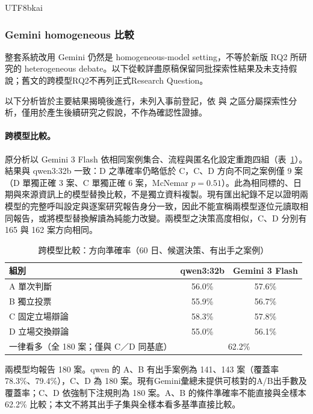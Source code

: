 \documentclass[12pt,a4paper]{article}
\newcommand{\grp}[1]{\textsf{#1}}
\begin{document}
\begin{CJK}{UTF8}{bkai}
\subsubsection{Gemini homogeneous 比較}

整套系統改用 Gemini 仍然是 homogeneous-model setting，不等於新版 RQ2 所研究的 heterogeneous debate。以下從較詳盡原稿保留同批探索性結果及未支持假說；舊文的跨模型RQ2不再列正式Research Question。


以下分析皆於主要結果揭曉後進行，未列入事前登記，依 \citet{wagenmakers2012agenda} 與 \citet{nosek2018prereg} 之區分屬探索性分析，僅用於產生後續研究之假說，不作為確認性證據。

\paragraph{跨模型比較。} 原分析以 Gemini 3 Flash 依相同案例集合、流程與匿名化設定重跑四組（表~\ref{tab:flash}）。結果與 qwen3:32b 一致：\grp{D} 之準確率仍略低於 \grp{C}，\grp{C}、\grp{D} 方向不同之案例僅 9 案（\grp{D} 單獨正確 3 案、\grp{C} 單獨正確 6 案，McNemar $p=0.51$）。此為相同標的、日期與來源資訊上的模型替換比較，不是獨立資料複製。現有匯出紀錄不足以證明兩模型的完整呼叫設定與逐案研究報告身分一致，因此不能宣稱兩模型逐位元讀取相同報告，或將模型替換解讀為純能力改變。兩模型之決策高度相似，\grp{C}、\grp{D} 分別有 165 與 162 案方向相同。

\begin{table}[H]
\centering\small
\caption{跨模型比較：方向準確率（60 日、候選決策、有出手之案例）}
\label{tab:flash}
\begin{tabular}{@{}lcc@{}}
\toprule
組別 & qwen3:32b & Gemini 3 Flash \\
\midrule
\grp{A} 單次判斷 & 56.0\% & 57.6\% \\
\grp{B} 獨立投票 & 55.9\% & 56.7\% \\
\grp{C} 固定立場辯論 & 58.3\% & 57.8\% \\
\grp{D} 立場交換辯論 & 55.0\% & 56.1\% \\
\midrule
一律看多（全 180 案；僅與 C／D 同基底） & \multicolumn{2}{c}{62.2\%} \\
\bottomrule
\end{tabular}
\par\smallskip
\raggedright\footnotesize 兩模型均報告 180 案。qwen 的 A、B 有出手案例為 141、143 案（覆蓋率 78.3\%、79.4\%），C、D 為 180 案。現有Gemini彙總未提供可核對的A/B出手數及覆蓋率；C、D 依強制下注規則為 180 案。A、B 的條件準確率不能直接與全樣本 62.2\% 比較；本文不將其出手子集與全樣本看多基準直接比較。
\end{table}


\end{CJK}
\end{document}
